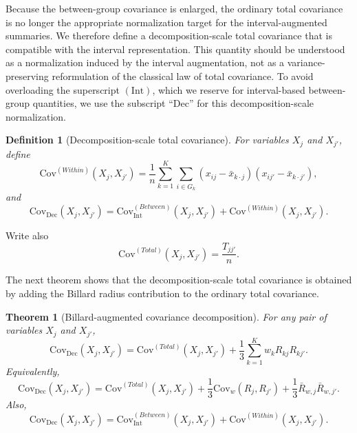 \documentclass[preprint, times, 12pt, authoryear]{elsarticle}
\newtheorem{theorem}{Theorem}
\newtheorem{definition}{Definition}
\begin{document}
Because the between-group covariance is enlarged, the ordinary total covariance is no longer the appropriate normalization target for the interval-augmented summaries. We therefore define a decomposition-scale total covariance that is compatible with the interval representation. This quantity should be understood as a normalization induced by the interval augmentation, not as a variance-preserving reformulation of the classical law of total covariance. To avoid overloading the superscript \((\mathrm{Int})\), which we reserve for interval-based between-group quantities, we use the subscript ``Dec'' for this decomposition-scale normalization.

\begin{definition}[Decomposition-scale total covariance]\label{def:aug_total_cov}
	For variables $X_j$ and $X_{j'}$, define
	\begin{equation}\label{eq:iwaba_within_cov}
		\mathrm{Cov}^{(Within)}(X_j,X_{j'})
		=
		\frac{1}{n}\sum_{k=1}^K\sum_{i\in G_k}
		(x_{ij}-\bar x_{k\cdot j})(x_{ij'}-\bar x_{k\cdot j'}),
	\end{equation}
	and
	\begin{equation}\label{eq:aug_total_cov_def}
		\mathrm{Cov}_{\mathrm{Dec}}(X_j,X_{j'})
		=
		\mathrm{Cov}_{\mathrm{Int}}^{(Between)}(X_j,X_{j'})
		+
		\mathrm{Cov}^{(Within)}(X_j,X_{j'}).
	\end{equation}
\end{definition}

Write also
\[
\mathrm{Cov}^{(Total)}(X_j,X_{j'})=\frac{T_{jj'}}{n}.
\]

The next theorem shows that the decomposition-scale total covariance is obtained by adding the Billard radius contribution to the ordinary total covariance.

\begin{theorem}[Billard-augmented covariance decomposition]\label{thm:iwaba}
	For any pair of variables $X_j$ and $X_{j'}$,
	\begin{equation}\label{eq:iwaba_total}
		\mathrm{Cov}_{\mathrm{Dec}}(X_j,X_{j'})
		=
		\mathrm{Cov}^{(Total)}(X_j,X_{j'})
		+
		\frac{1}{3}\sum_{k=1}^K w_k R_{kj}R_{kj'}.
	\end{equation}
	Equivalently,
	\begin{equation}\label{eq:iwaba_total_covform}
		\mathrm{Cov}_{\mathrm{Dec}}(X_j,X_{j'})
		=
		\mathrm{Cov}^{(Total)}(X_j,X_{j'})
		+
		\frac{1}{3}\mathrm{Cov}_w(R_j,R_{j'})
		+
		\frac{1}{3}\bar R_{w,j}\bar R_{w,j'}.
	\end{equation}
	Also,
	\begin{equation}\label{eq:iwaba_total_equiv}
		\mathrm{Cov}_{\mathrm{Dec}}(X_j,X_{j'})
		=
		\mathrm{Cov}_{\mathrm{Int}}^{(Between)}(X_j,X_{j'})
		+
		\mathrm{Cov}^{(Within)}(X_j,X_{j'}).
	\end{equation}
\end{theorem}
\end{document}
